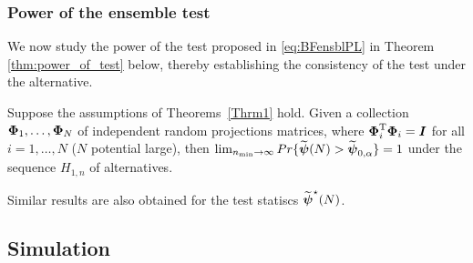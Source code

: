 \documentclass[APA,Times1COL]{WileyNJDv5} %
\def\boldpsi{{\mbox{\boldmath $\psi$}}}
\def\trans{^{\rm T}}
\newcommand{\uI}       {\mbox{\boldmath$I$}}
\newcommand{\uPhi}              {\mbox{\boldmath$\Phi$}}
\begin{document}
\subsubsection{Power of the ensemble test}
We now study the power of the test proposed in \eqref{eq:BFensblPL} in Theorem \ref{thm:power_of_test} below, thereby establishing the consistency of the test under the alternative.
\begin{theorem}\label{thm:power_of_test}
Suppose the assumptions of Theorems~\ref{Thrm1} hold. %
Given a collection $\uPhi_1, \ldots, \uPhi_N$ of independent random projections matrices,
where $\uPhi_{i}\trans\uPhi_{i} = \uI$ for all $i = 1, \ldots, N$ ($N$ potential large), then $\lim_{n_{\min} \rightarrow \infty} Pr\{\widetilde{\boldpsi}(N) > \widetilde{\boldpsi}_{0,\alpha}\}  = 1$ under the sequence $H_{1,n}$ of alternatives.
\end{theorem}
Similar results are also obtained for the test statiscs $\widetilde{\boldpsi}^{\star}(N)$. 
\subsection{Simulation}
\end{document}
